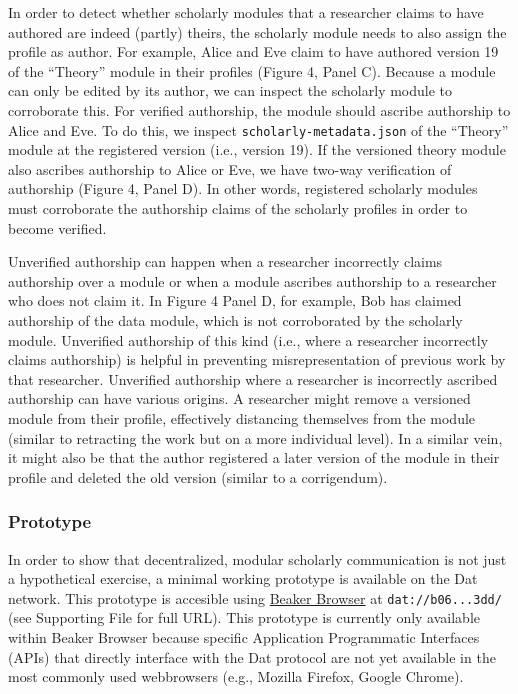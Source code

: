 \documentclass[a4paper]{article}
\begin{document}
In order to detect whether scholarly modules that a researcher claims to
have authored are indeed (partly) theirs, the scholarly module needs to
also assign the profile as author. For example, Alice and Eve claim to
have authored version 19 of the ``Theory'' module in their profiles
(Figure 4, Panel C). Because a module can only be edited by its author,
we can inspect the scholarly module to corroborate this. For verified
authorship, the module should ascribe authorship to Alice and Eve. To do
this, we inspect \texttt{scholarly-metadata.json} of the ``Theory''
module at the registered version (i.e., version 19). If the versioned
theory module also ascribes authorship to Alice or Eve, we have two-way
verification of authorship (Figure 4, Panel D). In other words,
registered scholarly modules must corroborate the authorship claims of
the scholarly profiles in order to become verified.

Unverified authorship can happen when a researcher incorrectly claims
authorship over a module or when a module ascribes authorship to a
researcher who does not claim it. In Figure 4 Panel D, for example, Bob
has claimed authorship of the data module, which is not corroborated by
the scholarly module. Unverified authorship of this kind (i.e., where a
researcher incorrectly claims authorship) is helpful in preventing
misrepresentation of previous work by that researcher. Unverified
authorship where a researcher is incorrectly ascribed authorship can
have various origins. A researcher might remove a versioned module from
their profile, effectively distancing themselves from the module
(similar to retracting the work but on a more individual level). In a
similar vein, it might also be that the author registered a later
version of the module in their profile and deleted the old version
(similar to a corrigendum).

\hypertarget{prototype}{%
\subsubsection{Prototype}\label{prototype}}

In order to show that decentralized, modular scholarly communication is
not just a hypothetical exercise, a minimal working prototype is
available on the Dat network. This prototype is accesible using
\href{https://beakerbrowser.com}{Beaker Browser} at
\texttt{dat://b06...3dd/} (see Supporting File for full URL). This
prototype is currently only available within Beaker Browser because
specific Application Programmatic Interfaces (APIs) that directly
interface with the Dat protocol are not yet available in the most
commonly used webbrowsers (e.g., Mozilla Firefox, Google Chrome).
\end{document}
